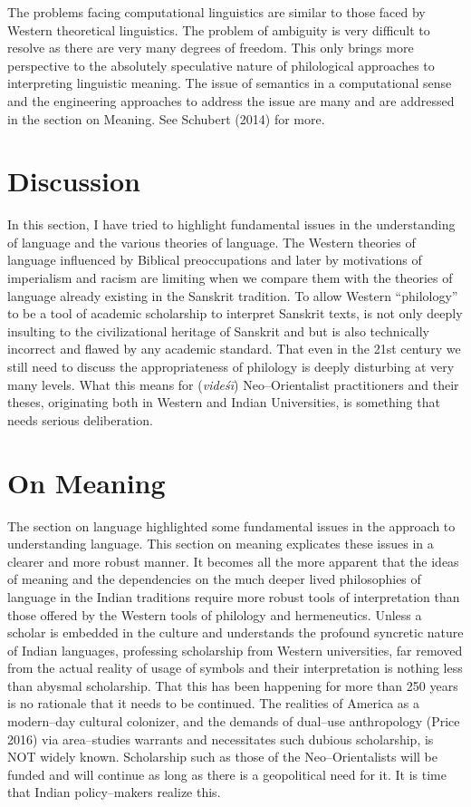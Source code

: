 The problems facing computational linguistics are similar to those faced by Western theoretical linguistics. The problem of ambiguity is very difficult to resolve as there are very many degrees of freedom. This only brings more perspective to the absolutely speculative nature of philological approaches to interpreting linguistic meaning. The issue of semantics in a computational sense and the engineering approaches to address the issue are many and are addressed in the section on Meaning. See Schubert (2014) for more.


\section*{Discussion}

In this section, I have tried to highlight fundamental issues in the understanding of language and the various theories of language. The Western theories of language influenced by Biblical preoccupations and later by motivations of imperialism and racism are limiting when we compare them with the theories of language already existing in the Sanskrit tradition. To allow Western “philology” to be a tool of academic scholarship to interpret Sanskrit texts, is not only deeply insulting to the civilizational heritage of Sanskrit and but is also technically incorrect and flawed by any academic standard. That even in the 21st century we still need to discuss the appropriateness of philology is deeply disturbing at very many levels. What this means for (\textit{videśī}) Neo–Orientalist practitioners and their theses, originating both in Western and Indian Universities, is something that needs serious deliberation.

\newpage


\section*{On Meaning}

The section on language highlighted some fundamental issues in the approach to understanding language. This section on meaning explicates these issues in a clearer and more robust manner. It becomes all the more apparent that the ideas of meaning and the dependencies on the much deeper lived philosophies of language in the Indian traditions require more robust tools of interpretation than those offered by the Western tools of philology and hermeneutics. Unless a scholar is embedded in the culture and understands the profound syncretic nature of Indian languages, professing scholarship from Western universities, far removed from the actual reality of usage of symbols and their interpretation is nothing less than abysmal scholarship. That this has been happening for more than 250 years is no rationale that it needs to be continued. The realities of America as a modern–day cultural colonizer, and the demands of dual–use anthropology (Price 2016) via area–studies warrants and necessitates such dubious scholarship, is NOT widely known. Scholarship such as those of the Neo–Orientalists will be funded and will continue as long as there is a geopolitical need for it. It is time that Indian policy–makers realize this.


